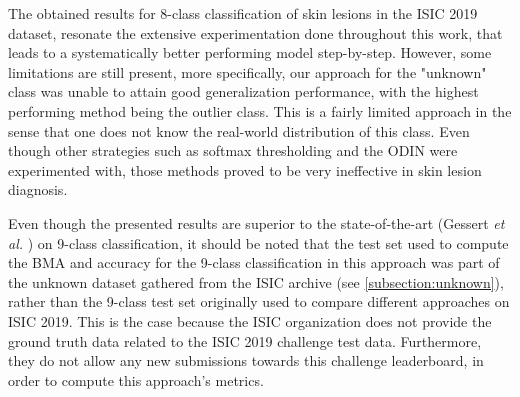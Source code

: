     The obtained results for 8-class classification of skin lesions in the \ac{ISIC} 2019 dataset, resonate the extensive experimentation done throughout this work, that leads to a systematically better performing model step-by-step. However, some limitations are still present, more specifically, our approach for the "unknown" class was unable to attain good generalization performance, with the highest performing method being the outlier class. This is a fairly limited approach in the sense that one does not know the real-world distribution of this class. Even though other strategies such as softmax thresholding and the \ac{ODIN} were experimented with, those methods proved to be very ineffective in skin lesion diagnosis. \par
    
    Even though the presented results are superior to the state-of-the-art (Gessert \textit{et al.} \cite{isic2019first}) on 9-class classification, it should be noted that the test set used to compute the \ac{BMA} and accuracy for the 9-class classification in this approach was part of the unknown dataset gathered from the \ac{ISIC} archive (see \autoref{subsection:unknown}), rather than the 9-class test set originally used to compare different approaches on \ac{ISIC} 2019. This is the case because the \ac{ISIC} organization does not provide the ground truth data related to the \ac{ISIC} 2019 challenge test data. Furthermore, they do not allow any new submissions towards this challenge leaderboard, in order to compute this approach's metrics. \par